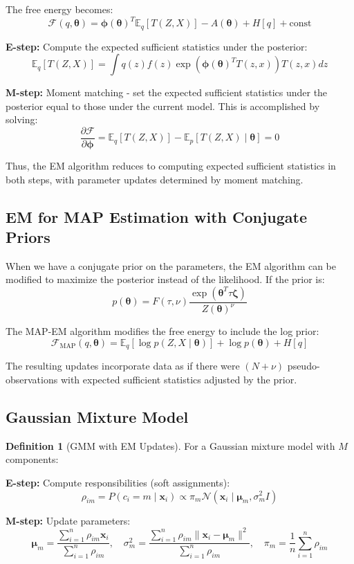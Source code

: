 \documentclass[12pt,a4paper]{article}
\theoremstyle{definition}
\newtheorem{definition}{Definition}[section]
\begin{document}
The free energy becomes:
\[
\mathcal{F}(q, \boldsymbol{\theta}) = \boldsymbol{\phi}(\boldsymbol{\theta})^T \mathbb{E}_q[T(Z, X)] - A(\boldsymbol{\theta}) + H[q] + \text{const}
\]

\textbf{E-step:} Compute the expected sufficient statistics under the posterior:
\[
\mathbb{E}_q[T(Z, X)] = \int q(z) f(z) \exp(\boldsymbol{\phi}(\boldsymbol{\theta})^T T(z, x)) T(z, x) dz
\]

\textbf{M-step:} Moment matching - set the expected sufficient statistics under the posterior equal to those under the current model. This is accomplished by solving:
\[
\frac{\partial \mathcal{F}}{\partial \boldsymbol{\phi}} = \mathbb{E}_q[T(Z, X)] - \mathbb{E}_p[T(Z, X) \mid \boldsymbol{\theta}] = 0
\]

Thus, the EM algorithm reduces to computing expected sufficient statistics in both steps, with parameter updates determined by moment matching.

\newpage


\subsection{EM for MAP Estimation with Conjugate Priors}

When we have a conjugate prior on the parameters, the EM algorithm can be modified to maximize the posterior instead of the likelihood. If the prior is:
\[
p(\boldsymbol{\theta}) = F(\tau, \nu) \frac{\exp(\boldsymbol{\theta}^T \tau \boldsymbol{\zeta})}{Z(\boldsymbol{\theta})^{\nu}}
\]

The MAP-EM algorithm modifies the free energy to include the log prior:
\[
\mathcal{F}_{\text{MAP}}(q, \boldsymbol{\theta}) = \mathbb{E}_q[\log p(Z, X \mid \boldsymbol{\theta})] + \log p(\boldsymbol{\theta}) + H[q]
\]

The resulting updates incorporate data as if there were $(N + \nu)$ pseudo-observations with expected sufficient statistics adjusted by the prior.

\subsection{Gaussian Mixture Model}

\begin{definition}[GMM with EM Updates]
For a Gaussian mixture model with $M$ components:

\textbf{E-step:} Compute responsibilities (soft assignments):
\[
\rho_{im} = P(c_i = m \mid \mathbf{x}_i) \propto \pi_m \mathcal{N}(\mathbf{x}_i \mid \boldsymbol{\mu}_m, \sigma_m^2 I)
\]

\textbf{M-step:} Update parameters:
\[
\boldsymbol{\mu}_m = \frac{\sum_{i=1}^n \rho_{im} \mathbf{x}_i}{\sum_{i=1}^n \rho_{im}}, \quad \sigma_m^2 = \frac{\sum_{i=1}^n \rho_{im} \|\mathbf{x}_i - \boldsymbol{\mu}_m\|^2}{\sum_{i=1}^n \rho_{im}}, \quad \pi_m = \frac{1}{n} \sum_{i=1}^n \rho_{im}
\]
\end{definition}
\end{document}
